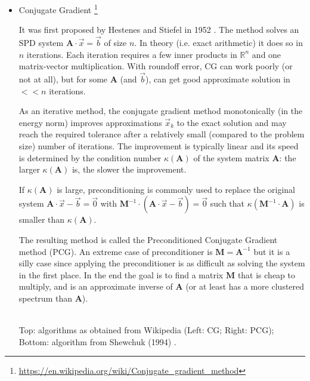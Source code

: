 \begin{itemize}
\item {\color{purple} Conjugate Gradient}
\footnote{\url{https://en.wikipedia.org/wiki/Conjugate_gradient_method}} 

It was first proposed by Hestenes and Stiefel in 1952 \cite{hest52}.
The method solves an SPD system ${\bm A}\cdot \vec{x} = \vec{b}$ of size $n$.
In theory (i.e. exact arithmetic) it does so in $n$ iterations.
Each iteration requires a few inner products in $\mathbb{R}^n$ and one matrix-vector multiplication.
With roundoff error, CG can work poorly (or not at all), but for some 
${\bm A}$ (and $\vec{b}$), can get good approximate solution in $<<n$ iterations.

As an iterative method, the conjugate gradient method monotonically (in the energy norm) 
improves approximations $\vec{x}_k$ to the exact solution and
may reach the required tolerance after a relatively small (compared to the problem size) number 
of iterations. The improvement is typically linear and its speed is determined by the 
condition number $\kappa({\bm A})$ of the system matrix ${\bm A}$: 
the larger $\kappa({\bm A})$ is, the slower the improvement.

If $\kappa({\bm A})$ is large, preconditioning is commonly used to replace the 
original system ${\bm A} \cdot \vec{x}-\vec{b}=\vec{0}$ 
with ${\bm M}^{-1}\cdot ({\bm A} \cdot \vec{x}-\vec{b})=\vec{0}$ 
such that $\kappa({\bm M}^{-1}\cdot {\bm A})$ 
is smaller than $\kappa({\bm A})$. 

The resulting method is called the Preconditioned Conjugate Gradient method (PCG).
An extreme case of preconditioner is ${\bm M}={\bm A}^{-1}$ but it is a silly case
since applying the preconditioner is as difficult as solving the system in the 
first place.
In the end the goal is to find a matrix ${\bm M}$ that is cheap to multiply, 
and is an approximate inverse of ${\bm A}$ 
(or at least has a more clustered spectrum than ${\bm A}$).

\begin{center}
\\
{\captionfont Top: algorithms as obtained from Wikipedia (Left: CG; Right: PCG);
Bottom: algorithm from Shewchuk (1994) \cite{shew94}.}
\end{center}


\end{itemize}
